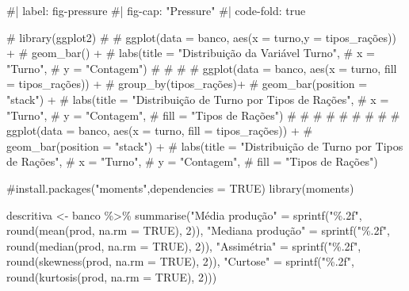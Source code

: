 \documentclass[
  letterpaper,
  DIV=11,
  numbers=noendperiod]{scrartcl}
\newenvironment{Shaded}{\begin{snugshade}}{\end{snugshade}}
\newcommand{\AttributeTok}[1]{\textcolor[rgb]{0.40,0.45,0.13}{#1}}
\newcommand{\CommentTok}[1]{\textcolor[rgb]{0.37,0.37,0.37}{#1}}
\newcommand{\ConstantTok}[1]{\textcolor[rgb]{0.56,0.35,0.01}{#1}}
\newcommand{\DecValTok}[1]{\textcolor[rgb]{0.68,0.00,0.00}{#1}}
\newcommand{\FunctionTok}[1]{\textcolor[rgb]{0.28,0.35,0.67}{#1}}
\newcommand{\NormalTok}[1]{\textcolor[rgb]{0.00,0.23,0.31}{#1}}
\newcommand{\OtherTok}[1]{\textcolor[rgb]{0.00,0.23,0.31}{#1}}
\newcommand{\SpecialCharTok}[1]{\textcolor[rgb]{0.37,0.37,0.37}{#1}}
\newcommand{\StringTok}[1]{\textcolor[rgb]{0.13,0.47,0.30}{#1}}
\begin{document}
\begin{Shaded}
\begin{Highlighting}[]
\CommentTok{\#| label: fig{-}pressure}
\CommentTok{\#| fig{-}cap: "Pressure"}
\CommentTok{\#| code{-}fold: true}



\CommentTok{\# library(ggplot2)}
\CommentTok{\# }
\CommentTok{\# ggplot(data = banco, aes(x = turno,y = tipos\_rações)) +}
\CommentTok{\#   geom\_bar() +}
\CommentTok{\#   labs(title = "Distribuição da Variável Turno",}
\CommentTok{\#        x = "Turno",}
\CommentTok{\#        y = "Contagem")}
\CommentTok{\# }
\CommentTok{\# }
\CommentTok{\# }
\CommentTok{\# ggplot(data = banco, aes(x = turno, fill = tipos\_rações)) +}
\CommentTok{\#   group\_by(tipos\_rações)+}
\CommentTok{\#   geom\_bar(position = "stack") +}
\CommentTok{\#   labs(title = "Distribuição de Turno por Tipos de Rações",}
\CommentTok{\#        x = "Turno",}
\CommentTok{\#        y = "Contagem",}
\CommentTok{\#        fill = "Tipos de Rações")}
\CommentTok{\# }
\CommentTok{\# }
\CommentTok{\# }
\CommentTok{\# }
\CommentTok{\# }
\CommentTok{\# }
\CommentTok{\# }
\CommentTok{\# }
\CommentTok{\# ggplot(data = banco, aes(x = turno, fill = tipos\_rações)) +}
\CommentTok{\#   geom\_bar(position = "stack") +}
\CommentTok{\#   labs(title = "Distribuição de Turno por Tipos de Rações",}
\CommentTok{\#        x = "Turno",}
\CommentTok{\#        y = "Contagem",}
\CommentTok{\#        fill = "Tipos de Rações")}

\CommentTok{\#install.packages("moments",dependencies = TRUE)}
\FunctionTok{library}\NormalTok{(moments)}

\NormalTok{descritiva }\OtherTok{\textless{}{-}}\NormalTok{ banco }\SpecialCharTok{\%\textgreater{}\%}
  \FunctionTok{summarise}\NormalTok{(}\StringTok{"Média produção"} \OtherTok{=} \FunctionTok{sprintf}\NormalTok{(}\StringTok{"\%.2f"}\NormalTok{, }\FunctionTok{round}\NormalTok{(}\FunctionTok{mean}\NormalTok{(prod, }\AttributeTok{na.rm =} \ConstantTok{TRUE}\NormalTok{), }\DecValTok{2}\NormalTok{)),}
            \StringTok{"Mediana produção"} \OtherTok{=} \FunctionTok{sprintf}\NormalTok{(}\StringTok{"\%.2f"}\NormalTok{, }\FunctionTok{round}\NormalTok{(}\FunctionTok{median}\NormalTok{(prod, }\AttributeTok{na.rm =} \ConstantTok{TRUE}\NormalTok{), }\DecValTok{2}\NormalTok{)),}
            \StringTok{"Assimétria"} \OtherTok{=} \FunctionTok{sprintf}\NormalTok{(}\StringTok{"\%.2f"}\NormalTok{, }\FunctionTok{round}\NormalTok{(}\FunctionTok{skewness}\NormalTok{(prod, }\AttributeTok{na.rm =} \ConstantTok{TRUE}\NormalTok{), }\DecValTok{2}\NormalTok{)),}
            \StringTok{"Curtose"} \OtherTok{=} \FunctionTok{sprintf}\NormalTok{(}\StringTok{"\%.2f"}\NormalTok{, }\FunctionTok{round}\NormalTok{(}\FunctionTok{kurtosis}\NormalTok{(prod, }\AttributeTok{na.rm =} \ConstantTok{TRUE}\NormalTok{), }\DecValTok{2}\NormalTok{)))}


\end{Highlighting}
\end{Shaded}
\end{document}
